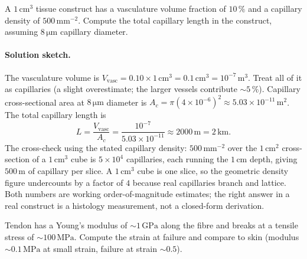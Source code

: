 \begin{exercise}
A $1\,\text{cm}^3$ tissue construct has a vasculature volume
fraction of $10\,\%$ and a capillary density of $500\,\text{mm}^{-2}$.
Compute the total capillary length in the construct, assuming
$8\,\si{\micro\meter}$ capillary diameter.
\end{exercise}

\paragraph{Solution sketch.} The vasculature volume is
$V_{\text{vasc}} = 0.10 \times 1\,\text{cm}^3 = 0.1\,\text{cm}^3
= 10^{-7}\,\text{m}^3$. Treat all of it as capillaries (a slight
overestimate; the larger vessels contribute $\sim 5\,\%$). Capillary
cross-sectional area at $8\,\si{\micro\meter}$ diameter is
$A_c = \pi (4 \times 10^{-6})^2 \approx 5.03 \times 10^{-11}\,\text{m}^2$.
The total capillary length is
\[
L = \frac{V_{\text{vasc}}}{A_c}
  = \frac{10^{-7}}{5.03 \times 10^{-11}}
  \approx 2000\,\text{m} = 2\,\text{km}.
\]
The cross-check using the stated capillary density:
$500\,\text{mm}^{-2}$ over the $1\,\text{cm}^2$ cross-section of a
$1\,\text{cm}^3$ cube is $5 \times 10^4$ capillaries, each running
the $1\,\text{cm}$ depth, giving $500\,\text{m}$ of capillary per
slice. A $1\,\text{cm}^3$ cube is one slice, so the geometric
density figure undercounts by a factor of $4$ because real
capillaries branch and lattice. Both numbers are working
order-of-magnitude estimates; the right answer in a real construct
is a histology measurement, not a closed-form derivation.

\begin{exercise}
Tendon has a Young's modulus of $\sim 1\,\text{GPa}$ along the
fibre and breaks at a tensile stress of $\sim 100\,\text{MPa}$.
Compute the strain at failure and compare to skin (modulus $\sim 0.1\,\text{MPa}$
at small strain, failure at strain $\sim 0.5$).
\end{exercise}

